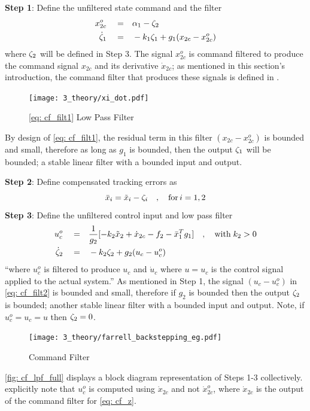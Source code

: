 \documentclass[12pt]{ucthesis}
\begin{document}
\noindent \textbf{Step 1}: Define the unfiltered state command and the filter
	\begin{align}
		\label{eq: cf_z}          x_{2c}^o \quad=&\quad \alpha_1 - \zeta_2 \\
		\label{eq: cf_filt1} \dot{\zeta}_1 \quad=&\quad -k_1\zeta_1 + g_1(x_{2c} -x_{2c}^o)
	\end{align}
where $\zeta_2$ will be defined in Step 3. The signal $x_{2c}^o$ is command filtered to produce the command signal $x_{2c}$ and its derivative $\dot{x}_{2c}$; as mentioned in this section's introduction, the command filter that produces these signals is defined in . 
%
	\begin{figure}[H]
		\centering
		\texttt{[image: 3\_theory/xi\_dot.pdf]}
		\caption{\autoref{eq: cf_filt1} Low Pass Filter}%
		\label{fig: cf_lpf}%
	\end{figure}
%
By design of \autoref{eq: cf_filt1}, the residual term in this filter $(x_{2c} -x_{2c}^o)$ is bounded and small, therefore as long as $g_1$ is bounded, then the output $\zeta_1$ will be bounded; a stable linear filter with a bounded input and output.

\noindent \textbf{Step 2}: Define compensated tracking errors as
	\begin{equation} \label{eq: cf_ecmp}%
		\bar{x}_i = \tilde{x}_i - \filt_i \quad,\quad \text{for} \, i = 1,2  
	\end{equation}
%
\noindent \textbf{Step 3}: Define the unfiltered control input and low pass filter
	\begin{align}
		\label{eq: cf_u} 	u_c^o  \quad=&\quad \frac{1}{g_2}[-k_2\tilde{x}_2 +\dot{x}_{2c} -f_2 -\bar{x}_1^T g_1] \quad,\quad \text{with} \; k_2 > 0 \\
		\label{eq: cf_filt2} \dot{\zeta}_2 \quad=&\quad -k_2\zeta_2 + g_2(u_c - u_c^o)
	\end{align}
``where $u_c^o$ is filtered to produce $u_c$ and $\dot{u}_c$ where $u = u_c$ is the control signal applied to the actual system.'' As mentioned in Step 1, the signal $(u_c - u_c^o)$ in \autoref{eq: cf_filt2} is bounded and small, therefore if $g_2$ is bounded then the output $\zeta_2$ is bounded; another stable linear filter with a bounded input and output. Note, if $u_c^o=u_c=u$ then $\zeta_2=0$.
%
	\begin{figure}[H]
		\centering
		\texttt{[image: 3\_theory/farrell\_backstepping\_eg.pdf]}
		\caption{Command Filter \citep{Farrell2006}}%
		\label{fig: cf_lpf_full}%
	\end{figure}
%
\indent \autoref{fig: cf_lpf_full} displays a block diagram representation of Steps 1-3 collectively. \citet{Farrell2006} explicitly note that $u_c^o$ is computed using $\dot{x}_{2c}$ and not $\dot{x}_{2c}^o$, where $\dot{x}_{2c}$ is the output of the command filter for \autoref{eq: cf_z}.
\end{document}
